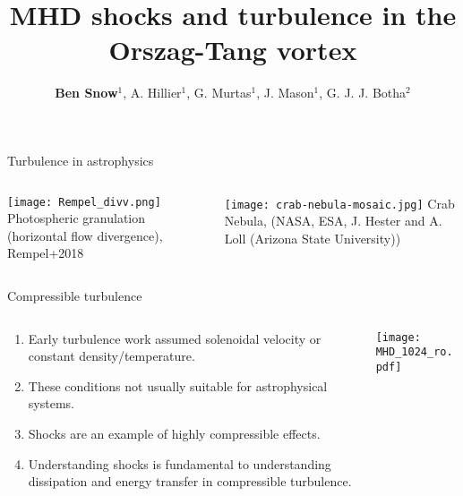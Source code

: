 \documentclass[10pt,aspectratio=169,usenames,dvipsnames]{beamer}
\title{MHD shocks and turbulence in the Orszag-Tang vortex}
\date{}
\author{\textbf{Ben Snow$^1$}, A. Hillier$^1$, G. Murtas$^1$, J. Mason$^1$, G. J. J. Botha$^2$}
\institute{$^1$University of Exeter, $^2$ Northumbria University \\ NAM2023, July 2023.}
\begin{document}
\maketitle

\begin{frame}{Turbulence in astrophysics}
\begin{columns}
\begin{column}{0.5\textwidth}
\texttt{[image: Rempel\_divv.png]} Photospheric granulation (horizontal flow divergence), Rempel+2018
\end{column}
\begin{column}{0.5\textwidth}
\texttt{[image: crab-nebula-mosaic.jpg]} Crab Nebula,  (NASA, ESA, J. Hester and A. Loll (Arizona State University))
\end{column}
\end{columns}
\end{frame}

\begin{frame}{Compressible turbulence}
\begin{columns}
\begin{column}{0.4\textwidth}
\begin{enumerate}
\item Early turbulence work assumed solenoidal velocity or constant density/temperature.
\item These conditions not usually suitable for astrophysical systems.
\item Shocks are an example of highly compressible effects.
\item Understanding shocks is fundamental to understanding dissipation and energy transfer in compressible turbulence.
\end{enumerate}
\end{column}
\begin{column}{0.6\textwidth}
\texttt{[image: MHD\_1024\_ro.pdf]}
\end{column}
\end{columns}
\end{frame}
\end{document}
